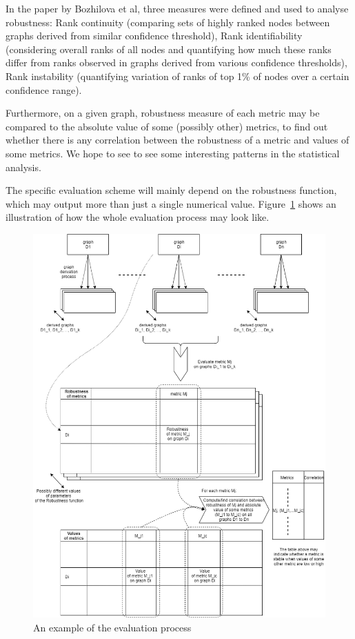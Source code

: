 In the paper by Bozhilova et al, three measures were defined and used to analyse robustness: Rank continuity (comparing sets of highly ranked nodes between graphs derived from similar confidence threshold), Rank identifiability (considering overall ranks of all nodes and quantifying how much these ranks differ from ranks observed in graphs derived from various confidence thresholds), Rank instability (quantifying variation of ranks of top 1\% of nodes over a certain confidence range).

Furthermore, on a given graph, robustness measure of each metric may be compared to the absolute value of some (possibly other) metrics, to find out whether there is any correlation between the robustness of a metric and values of some metrics. We hope to see to see some interesting patterns in the statistical analysis.

The specific evaluation scheme will mainly depend on the robustness function, which may output more than just a single numerical value. Figure~\ref{fig:example_eval} shows an illustration of how the whole evaluation process may look like.

\begin{figure}[p!]
    \centering
    \includegraphics[width=16cm]{images/proposal_diagram1.png}
    \caption{An example of the evaluation process}
    \label{fig:example_eval}
\end{figure}

